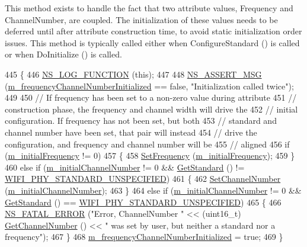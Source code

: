 This method exists to handle the fact that two attribute values, Frequency and Channel\+Number, are coupled. The initialization of these values needs to be deferred until after attribute construction time, to avoid static initialization order issues. This method is typically called either when Configure\+Standard () is called or when Do\+Initialize () is called. 
\begin{DoxyCode}
445 \{
446   \hyperlink{log-macros-disabled_8h_a90b90d5bad1f39cb1b64923ea94c0761}{NS\_LOG\_FUNCTION} (\textcolor{keyword}{this});
447 
448   \hyperlink{assert_8h_aff5ece9066c74e681e74999856f08539}{NS\_ASSERT\_MSG} (\hyperlink{classns3_1_1WifiPhy_aac5b6bb7af0e3c2c3590ab1d893a34d2}{m\_frequencyChannelNumberInitialized} == \textcolor{keyword}{
      false}, \textcolor{stringliteral}{"Initialization called twice"});
449 
450   \textcolor{comment}{// If frequency has been set to a non-zero value during attribute}
451   \textcolor{comment}{// construction phase, the frequency and channel width will drive the}
452   \textcolor{comment}{// initial configuration.  If frequency has not been set, but both}
453   \textcolor{comment}{// standard and channel number have been set, that pair will instead}
454   \textcolor{comment}{// drive the configuration, and frequency and channel number will be}
455   \textcolor{comment}{// aligned}
456   \textcolor{keywordflow}{if} (\hyperlink{classns3_1_1WifiPhy_a599d1a4cbb27e5a9f4dbef69d29c5b5a}{m\_initialFrequency} != 0)
457     \{
458       \hyperlink{classns3_1_1WifiPhy_afecd69b20631e112aa863dbed4c4bd22}{SetFrequency} (\hyperlink{classns3_1_1WifiPhy_a599d1a4cbb27e5a9f4dbef69d29c5b5a}{m\_initialFrequency});
459     \}
460   \textcolor{keywordflow}{else} \textcolor{keywordflow}{if} (\hyperlink{classns3_1_1WifiPhy_a318e964855d1e96bfb3af870be9fc0a2}{m\_initialChannelNumber} != 0 && \hyperlink{classns3_1_1WifiPhy_af33f60586f8e0bd1763b863e7ce193b2}{GetStandard} () != 
      \hyperlink{group__wifi_gga1299834f4e1c615af3ca738033b76a49a95f590f4512ff9645bba0b4f2650f92d}{WIFI\_PHY\_STANDARD\_UNSPECIFIED})
461     \{
462       \hyperlink{classns3_1_1WifiPhy_a2d13cf6ae4c185cae8516516afe4a32a}{SetChannelNumber} (\hyperlink{classns3_1_1WifiPhy_a318e964855d1e96bfb3af870be9fc0a2}{m\_initialChannelNumber});
463     \}
464   \textcolor{keywordflow}{else} \textcolor{keywordflow}{if} (\hyperlink{classns3_1_1WifiPhy_a318e964855d1e96bfb3af870be9fc0a2}{m\_initialChannelNumber} != 0 && \hyperlink{classns3_1_1WifiPhy_af33f60586f8e0bd1763b863e7ce193b2}{GetStandard} () == 
      \hyperlink{group__wifi_gga1299834f4e1c615af3ca738033b76a49a95f590f4512ff9645bba0b4f2650f92d}{WIFI\_PHY\_STANDARD\_UNSPECIFIED})
465     \{
466       \hyperlink{group__fatal_ga5131d5e3f75d7d4cbfd706ac456fdc85}{NS\_FATAL\_ERROR} (\textcolor{stringliteral}{"Error, ChannelNumber "} << (uint16\_t)
      \hyperlink{classns3_1_1WifiPhy_a5cf0ccf06109ace61db51c83e91b7e8d}{GetChannelNumber} () << \textcolor{stringliteral}{" was set by user, but neither a standard nor a frequency"});
467     \}
468   \hyperlink{classns3_1_1WifiPhy_aac5b6bb7af0e3c2c3590ab1d893a34d2}{m\_frequencyChannelNumberInitialized} = \textcolor{keyword}{true};
469 \}
\end{DoxyCode}


